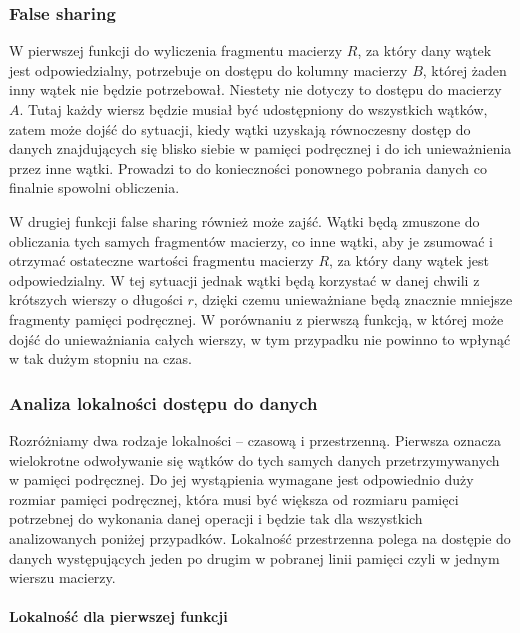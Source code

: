 \documentclass{article}
\begin{document}
\subsubsection{False sharing}

W pierwszej funkcji do wyliczenia fragmentu macierzy $R$, za który dany wątek jest odpowiedzialny, potrzebuje on dostępu do kolumny macierzy $B$, której żaden inny wątek nie będzie potrzebował. Niestety nie dotyczy to dostępu do macierzy $A$. Tutaj każdy wiersz będzie musiał być udostępniony do wszystkich wątków, zatem może dojść do sytuacji, kiedy wątki uzyskają równoczesny dostęp do danych znajdujących się blisko siebie w pamięci podręcznej i do ich unieważnienia przez inne wątki. Prowadzi to do konieczności ponownego pobrania danych co finalnie spowolni obliczenia.

W drugiej funkcji false sharing również może zajść. Wątki będą zmuszone do obliczania tych samych fragmentów macierzy, co inne wątki, aby je zsumować i otrzymać ostateczne wartości fragmentu macierzy $R$, za który dany wątek jest odpowiedzialny. W tej sytuacji jednak wątki będą korzystać w danej chwili z krótszych wierszy o długości $r$, dzięki czemu unieważniane będą znacznie mniejsze fragmenty pamięci podręcznej. W porównaniu z pierwszą funkcją, w której może dojść do unieważniania całych wierszy, w tym przypadku nie powinno to wpłynąć w tak dużym stopniu na czas. 

\subsubsection{Analiza lokalności dostępu do danych}

Rozróżniamy dwa rodzaje lokalności -- czasową i przestrzenną. Pierwsza oznacza wielokrotne odwoływanie się wątków do tych samych danych przetrzymywanych w pamięci podręcznej. Do jej wystąpienia wymagane jest odpowiednio duży rozmiar pamięci podręcznej, która musi być większa od rozmiaru pamięci potrzebnej do wykonania danej operacji i będzie tak dla wszystkich analizowanych poniżej przypadków. Lokalność przestrzenna polega na dostępie do danych występujących jeden po drugim w pobranej linii pamięci czyli w jednym wierszu macierzy.

\paragraph{Lokalność dla pierwszej funkcji}
\end{document}
